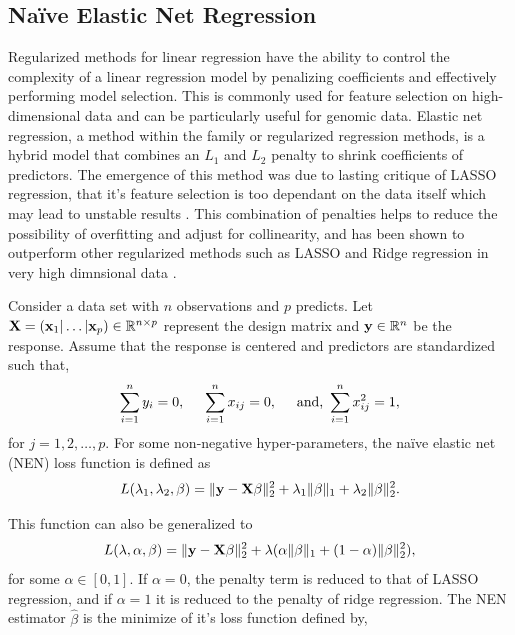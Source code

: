 \documentclass[
	a4paper, %
	10pt, %
	unnumberedsections, %
	twoside, %
]{LTJournalArticle}
\newcommand{\R}{\mathbb R}
\newcommand{\1}{\mathbbm{1}}
\begin{document}
\subsection{Naïve Elastic Net Regression}

Regularized methods for linear regression have the ability to control the complexity of a linear regression model by penalizing coefficients and effectively performing model selection. This is commonly used for feature selection on high-dimensional data and can be particularly useful for genomic data. Elastic net regression, a method within the family or regularized regression methods, is a hybrid model that combines an $L_1$ and $L_2$ penalty to shrink coefficients of predictors. The emergence of this method was due to lasting critique of LASSO regression, that it's feature selection is too dependant on the data itself which may lead to unstable results \cite{Zou2005}. This combination of penalties helps to reduce the possibility of overfitting and adjust for collinearity, and has been shown to outperform other regularized methods such as LASSO and Ridge regression in very high dimnsional data \cite{Torang2019, Zou2005}. 

Consider a data set with $n$ observations and $p$ predicts. Let ${\bf X} = ({\bf x}_1 | \ldots | {\bf x}_p) \in \R^{n \times p}$ represent the design matrix and ${\bf y} \in \R^n$ be the response. Assume that the response is centered and predictors are standardized such that,
\begin{equation}
\label{eq:EN-assume}
\sum_{i=1}^n y_i = 0, \hspace{5mm}
 \sum_{i=1}^n x_{ij} = 0, \hspace{5mm} 
 \text{and, } 
 \sum_{i=1}^n x_{ij}^2 = 1,
 \end{equation}
for $j = 1, 2, \ldots, p$. For some non-negative hyper-parameters, the naïve elastic net (NEN) loss function is defined as
\begin{equation}
    \label{eq:EN-loss}
    L(\lambda_1, \lambda_2, \beta) = \|{\bf y} - {\bf X} \beta\|_2^2 + \lambda_1 \|\beta\|_1 + \lambda_2 \|\beta\|^2_2.
\end{equation}


\noindent This function can also be generalized to 
\begin{equation}
\label{eq::EN-alt}
     L(\lambda, \alpha, \beta) = \|{\bf y} - {\bf X} \beta\|_2^2 + \lambda (\alpha \|\beta\|_1 + (1- \alpha) \|\beta\|^2_2),
\end{equation}
\noindent for some $\alpha \in [0, 1]$. If $\alpha=0$, the penalty term is reduced to that of LASSO regression, and if $\alpha=1$ it is reduced to the penalty of ridge regression. The NEN estimator $\hat{\beta}$ is the minimize of it's loss function defined by,
\end{document}
